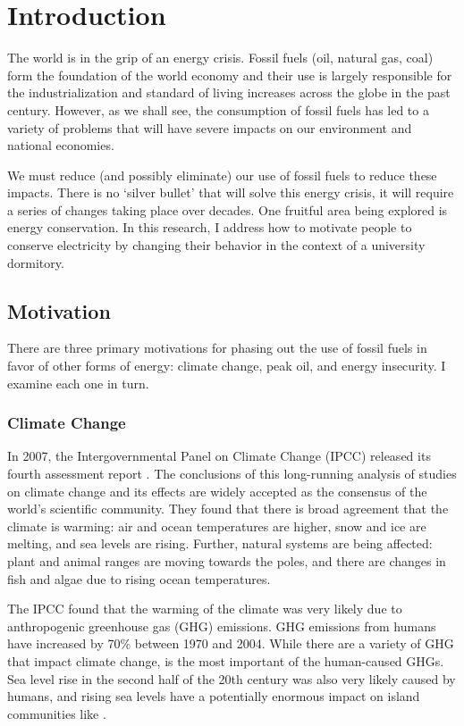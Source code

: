 \chapter{Introduction}

The world is in the grip of an energy crisis. Fossil fuels (oil, natural gas, coal) form the foundation of the world economy and their use is largely responsible for the industrialization and standard of living increases across the globe in the past century. However, as we shall see, the consumption of fossil fuels has led to a variety of problems that will have severe impacts on our environment and national economies.

We must reduce (and possibly eliminate) our use of fossil fuels to reduce these impacts. There is no `silver bullet' that will solve this energy crisis, it will require a series of changes taking place over decades. One fruitful area being explored is energy conservation. In this research, I address how to motivate people to conserve electricity by changing their behavior in the context of a university dormitory.

\section{Motivation}
\label{sec:motivation}

There are three primary motivations for phasing out the use of fossil fuels in favor of other forms of energy: climate change, peak oil, and energy insecurity. I examine each one in turn.

\subsection{Climate Change}
\label{sec:climate-change}

In 2007, the Intergovernmental Panel on Climate Change (IPCC) released its fourth assessment report \cite{IPCC-synthesis-report-2007}. The conclusions of this long-running analysis of studies on climate change and its effects are widely accepted as the consensus of the world's scientific community. They found that there is broad agreement that the climate is warming: air and ocean temperatures are higher, snow and ice are melting, and sea levels are rising. Further, natural systems are being affected: plant and animal ranges are moving towards the poles, and there are changes in fish and algae due to rising ocean temperatures.

The IPCC found that the warming of the climate was very likely due to anthropogenic greenhouse gas (GHG) emissions. GHG emissions from humans have increased by 70\% between 1970 and 2004. While there are a variety of GHG that impact climate change, \COtwo is the most important of the human-caused GHGs. Sea level rise in the second half of the 20th century was also very likely caused by humans, and rising sea levels have a potentially enormous impact on island communities like \Hawaii.

